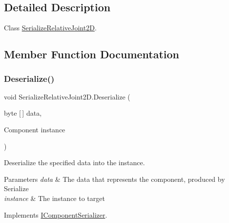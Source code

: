 \subsection{Detailed Description}
Class \hyperlink{class_serialize_relative_joint2_d}{Serialize\+Relative\+Joint2D}. 



\subsection{Member Function Documentation}
\mbox{\label{class_serialize_relative_joint2_d_a48e35c8c7fa333d24579df5f00128a50}} 
\subsubsection{\texorpdfstring{Deserialize()}{Deserialize()}}
{\footnotesize\ttfamily void Serialize\+Relative\+Joint2\+D.\+Deserialize (\begin{DoxyParamCaption}\item[{byte \mbox{[}$\,$\mbox{]}}]{data,  }\item[{Component}]{instance }\end{DoxyParamCaption})\hspace{0.3cm}{\ttfamily [inline]}}



Deserialize the specified data into the instance. 


\begin{DoxyParams}{Parameters}
{\em data} & The data that represents the component, produced by Serialize\\
\hline
{\em instance} & The instance to target\\
\hline
\end{DoxyParams}


Implements \hyperlink{interface_i_component_serializer_a4cc366a5c78b33d47a90c209d8fed883}{I\+Component\+Serializer}.

\mbox{\label{class_serialize_relative_joint2_d_a4769d5255430ffa12107acdc03a2e73a}} 
